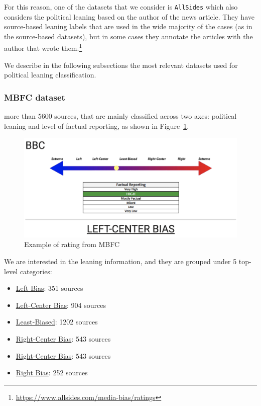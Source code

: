 For this reason, one of the datasets that we consider is \texttt{AllSides} which also considers the political leaning based on the author of the news article. They have source-based leaning labels that are used in the wide majority of the cases (as in the source-based datasets), but in some cases they annotate the articles with the author that wrote them.\footnote{\url{https://www.allsides.com/media-bias/ratings}}




We describe in the following subsections the most relevant datasets used for political leaning classification.



\subsubsection{MBFC dataset}

more than 5600 sources, that are mainly classified across two axes: political leaning and level of factual reporting, as shown in Figure~\ref{fig:mbfc_bbc}.

\begin{figure}[!htbp]
    \centering
    \includegraphics[width=\linewidth]{figures/mbfc_bbc.png}
    \caption{Example of rating from MBFC}
    \label{fig:mbfc_bbc}
\end{figure}

We are interested in the leaning information, and they are grouped under 5 top-level categories:

\begin{itemize}
    \item \href{https://mediabiasfactcheck.com/left/}{Left Bias}: 351 sources
    \item \href{https://mediabiasfactcheck.com/leftcenter/}{Left-Center Bias}: 904 sources
    \item \href{https://mediabiasfactcheck.com/center/}{Least-Biased}: 1202 sources
    \item \href{https://mediabiasfactcheck.com/right-center/}{Right-Center Bias}: 543 sources
    \item \href{https://mediabiasfactcheck.com/center/}{Right-Center Bias}: 543 sources
    \item \href{https://mediabiasfactcheck.com/right/}{Right Bias}: 252 sources
\end{itemize}

